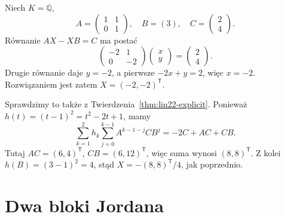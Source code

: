 \begin{przyklad}
\label{prz:lin22-explicit}
Niech \(K=\mathbb Q\),
\[
 A=\begin{pmatrix}1&1\\0&1\end{pmatrix},
 \quad B=(3),
 \quad C=\begin{pmatrix}2\\4\end{pmatrix}.
\]
Równanie \(AX-XB=C\)
ma postać
\[
 \begin{pmatrix}-2&1\\0&-2\end{pmatrix}
 \begin{pmatrix}x\\y\end{pmatrix}
 =\begin{pmatrix}2\\4\end{pmatrix}.
\]
Drugie równanie daje \(y=-2\),
a pierwsze \(-2x+y=2\),
więc \(x=-2\).
Rozwiązaniem jest zatem
\(X=(-2,-2)^{\mathsf T}\).

Sprawdzimy to także z
Twierdzenia~\ref{thm:lin22-explicit}.
Ponieważ \(h(t)=(t-1)^2=t^2-2t+1\),
mamy
\[
 \sum_{k=1}^{2}h_k
 \sum_{j=0}^{k-1}A^{k-1-j}CB^j
 =-2C+AC+CB.
\]
Tutaj \(AC=(6,4)^{\mathsf T}\),
\(CB=(6,12)^{\mathsf T}\),
więc suma wynosi
\((8,8)^{\mathsf T}\).
Z kolei \(h(B)=(3-1)^2=4\),
stąd \(X=-(8,8)^{\mathsf T}/4\),
jak poprzednio.
\end{przyklad}

\section{Dwa bloki Jordana}
\label{sec:lin22-jordan}

